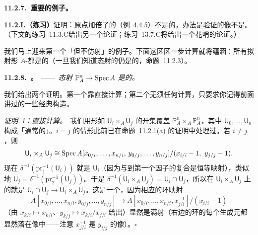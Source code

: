 \textbf{11.2.7.\ 重要的例子。}

\textbf{11.2.I.（练习）}\quad 证明：原点加倍了的\trAffineLine（例~4.4.5）不是\trSeparated{}的，办法是验证\trDiagonalMorphism{}的像不是\trClosedSubset。（下文的\mbox{练习~11.3.C}给出另一个论证；\mbox{练习~13.7.C}将给出一个花哨的论证。）

我们马上迎来第一个「\trSeparated{}但不仿射」的例子。下面这区区一步计算就将蕴涵：所有拟射影 $A$-\trScheme{}都是\trSeparated{}的（一旦我们知道\trSeparated{}态射的\trComposition{}仍是\trSeparated{}的，命题~11.2.3）。

\textbf{11.2.8.\ \trhProposition{}。}\ ——\ \emph{态射 $\mathbb{P}^n_A\to\operatorname{Spec} A$ 是\trSeparated{}的。}

我们给出两个证明。第一个靠直接计算；第二个无须任何计算，只要求你记得前面讲过的一些经典构造。

\emph{证明~1：直接计算。}\ 我们用形如 $\mathsf{U}_i\times_A\mathsf{U}_j$ 的开集覆盖 $\mathbb{P}^n_A\times_A\mathbb{P}^n_A$，其中 $\mathsf{U}_0,\dots,\mathsf{U}_n$ 构成「通常的」\trAffine\trOpenCover。$i=j$ 的情形此前已在命题~11.2.1(a) 的证明中处理过。若 $i\neq j$，则
\[
\mathsf{U}_i\times_A\mathsf{U}_j\cong\Spec A[x_{0/i},\dots,x_{n/i},\,y_{0/j},\dots,y_{n/j}]/(x_{i/i}-1,\ y_{j/j}-1).
\]
现在 $\delta^{-1}(\mathrm{pr}_1^{-1}(\mathsf{U}_i))$ 就是 $\mathsf{U}_i$（因为\trDiagonalMorphism{}与到第一个因子的\trProjection{}复合是恒等映射），类似地 $\mathsf{U}_j=\delta^{-1}(\mathrm{pr}_2^{-1}(\mathsf{U}_j))$。于是 $\delta^{-1}(\mathsf{U}_i\times_A\mathsf{U}_j)=\mathsf{U}_i\cap\mathsf{U}_j$，所以在 $\mathsf{U}_i\times_A\mathsf{U}_j$ 上的\trDiagonalMorphism{}就是 $\mathsf{U}_i\cap\mathsf{U}_j\to\mathsf{U}_i\times_A\mathsf{U}_j$。这是一个\trClosedEmbedding，因为相应的环映射
\[
A[x_{0/i},\dots,x_{n/i},y_{0/j},\dots,y_{n/j}]
\longrightarrow
A[x_{0/i},\dots,x_{n/i},x_{j/i}^{-1}]/(x_{i/i}-1)
\]
（由 $x_{k/i}\mapsto x_{k/i}$、$y_{k/j}\mapsto x_{k/i}/x_{j/i}$ 给出）显然是满射（右边的环的每个生成元都显然落在像中——注意 $x_{j/i}^{-1}$ 是 $y_{i/j}$ 的像）。\hfill$\square$

